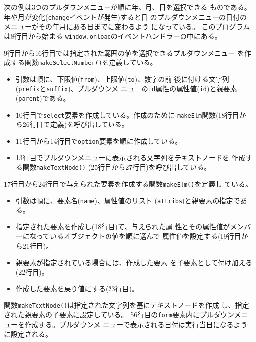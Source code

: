\begin{Exec}\upshape\label{pulldownDate}
次の例は3つのプルダウンメニューが順に年、月、日を選択できる
 ものである。年や月が変化(\texttt{change}イベントが発生)すると日
 のプルダウンメニューの日付のメニューがその年月にある日までに変わるよう
 になっている。
 このプログラムは8行目から始まる
       \texttt{window.onload}のイベントハンドラーの中にある。

 9行目から16行目では指定された範囲の値を選択できるプルダウンメニュー
       を作成する関数\texttt{makeSelectNumber()}を定義している。
\begin{itemize}
 \item 引数は順に、下限値(\texttt{from})、上限値(\texttt{to})、数字の前
       後に付ける文字列(\texttt{prefix}と\texttt{suffix})、プルダウンメ
       ニュ－の\texttt{id}属性の属性値(\texttt{id})と親要素
       (\texttt{parent})である。
 \item 10行目で\texttt{select}要素を作成している。作成のために
       \texttt{makeElm}関数(18行目から26行目で定義)を呼び出している。
 \item 11行目から14行目で\texttt{option}要素を順に作成している。
 \item 13行目でプルダウンメニューに表示される文字列をテキストノードを
       作成する関数\texttt{makeTextNode()} (25行目から27行目)を呼び出している。
\end{itemize}
17行目から24行目で与えられた要素を作成する関数\texttt{makeElm()}を定義し
 ている。
\begin{itemize}
 \item 引数は順に、要素名(\texttt{name})、属性値のリスト
       (\texttt{attribs})と親要素の指定である。
 \item 指定された要素を作成し(18行目)て、与えられた属
			 性とその属性値がメンバーになっているオブジェクトの値を順に選んで
			 属性値を設定する(19行目から21行目)。
 \item 親要素が指定されている場合には、作成した要素
       を子要素として付け加える(22行目)。
 \item 作成した要素を戻り値にする(23行目)。
\end{itemize}
関数\texttt{makeTextNode()}は指定された文字列を基にテキストノードを作成
 し、指定された親要素の子要素に設定している。
56行目の\texttt{form}要素内にプルダウンメニューを作成する。プルダウンメ
 ニューで表示される日付は実行当日になるように設定される。

\end{Exec}
